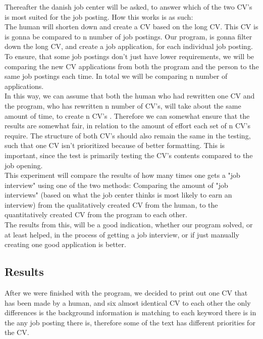 Thereafter the danish job center will be asked, to answer which of the two CV's is most suited
for the job posting. How this works is as such:
\\
The human will shorten down and create a CV based on the long CV. This CV is
is gonna be compared to n number of job postings.
Our program, is gonna filter down the long CV, and create a job application,
for each individual job posting. 
To ensure, that some job postings don't just have lower requirements, we will be
comparing the new CV applications from both the program and the person to the same 
job postings each time. In total we will be comparing n number of applications.
\\
In this way, we can assume that both the human who had rewritten one
CV and the program, who has rewritten n number of CV's,
will take about the same amount of time, to create n CV's .
Therefore we can somewhat ensure that the results are somewhat fair, in relation to the amount of effort each set of n CV's require.
The structure of both CV's should also remain the same in the testing, such that one CV isn't prioritized because of better formatting.
This is important, since the test is primarily testing the CV's contents compared to the job opening.
\\
This experiment will compare the results of how many times one gets a "job
interview" using one of the two methods: Comparing the amount of 
"job interviews" (based on what the job center thinks is most likely to earn an interview) 
from the qualitatively created CV from
the human, to the quantitatively created CV from the program to
each other.
\\
The results from this, will be a good indication, whether our program solved, or
at least helped, in the process of getting a job interview, or if just manually
creating one good application is better.

\subsection{Results}
After we were finished with the program, we decided to print out one CV that has been made by a human,
and six almost identical CV to each other the only differences is 
the background information is matching to each keyword there is in the any job posting there is, 
therefore some of the text has different priorities for the CV. \\

